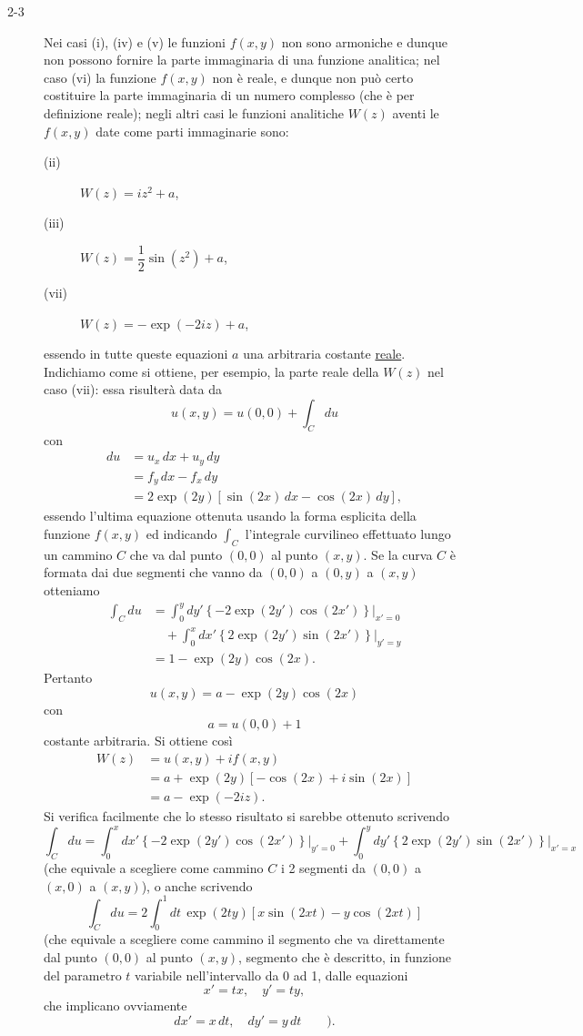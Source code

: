 \documentclass[11pt, a4paper]{book}
\numberwithin{equation}{section}
\begin{document}
\begin{description}
\item[2-3] Nei casi (i), (iv) e (v) le funzioni $f(x,y)$ non sono armoniche e dunque non possono fornire la parte immaginaria di una funzione analitica; nel caso (vi) la funzione $f(x,y)$ non è reale, e dunque non può certo costituire la parte immaginaria di un numero complesso (che è per definizione reale); negli altri casi le funzioni analitiche $W(z)$ aventi le $f(x,y)$ date come parti immaginarie sono:

\begin{description}
\item[(ii)] $W(z) = i z^2 + a$,
\item[(iii)] $W(z) = \dfrac{1}{2}\sin(z^2) + a$,
\item[(vii)] $W(z) = -\exp(-2iz) + a$,
\end{description}

essendo in tutte queste equazioni $a$ una arbitraria costante \underline{reale}. Indichiamo come si ottiene, per esempio, la parte reale della $W(z)$ nel caso (vii): essa risulterà data da
$$u(x,y) = u(0,0) + \int_C du$$
con
\begin{align*}
du &= u_x\, dx + u_y\, dy \\
&= f_y\, dx - f_x\, dy \\
&= 2\exp(2y)\left[\sin(2x)\, dx - \cos(2x)\, dy\right],
\end{align*}
essendo l'ultima equazione ottenuta usando la forma esplicita della funzione $f(x,y)$ ed indicando $\int_C$ l'integrale curvilineo effettuato lungo un cammino $C$ che va dal punto $(0,0)$ al punto $(x,y)$. Se la curva $C$ è formata dai due segmenti che vanno da $(0,0)$ a $(0,y)$ a $(x,y)$ otteniamo
\begin{align*}
\int_C du &= \int_0^y dy' \left\{-2\exp(2y')\cos(2x')\right\}\Big|_{x'=0} \\
&\quad + \int_0^x dx' \left\{2\exp(2y')\sin(2x')\right\}\Big|_{y'=y} \\
&= 1 - \exp(2y)\cos(2x).
\end{align*}
Pertanto
$$u(x,y) = a - \exp(2y)\cos(2x)$$
con
$$a = u(0,0) + 1$$
costante arbitraria. Si ottiene così
\begin{align*}
W(z) &= u(x,y) + i f(x,y) \\
&= a + \exp(2y)\left[-\cos(2x) + i\sin(2x)\right] \\
&= a - \exp(-2iz).
\end{align*}
Si verifica facilmente che lo stesso risultato si sarebbe ottenuto scrivendo
$$\int_C du = \int_0^x dx' \left\{-2\exp(2y')\cos(2x')\right\}\Big|_{y'=0} + \int_0^y dy' \left\{2\exp(2y')\sin(2x')\right\}\Big|_{x'=x}$$
(che equivale a scegliere come cammino $C$ i 2 segmenti da $(0,0)$ a $(x,0)$ a $(x,y)$), o anche scrivendo
$$\int_C du = 2\int_0^1 dt\, \exp(2ty)\left[x\sin(2xt) - y\cos(2xt)\right]$$
(che equivale a scegliere come cammino il segmento che va direttamente dal punto $(0,0)$ al punto $(x,y)$, segmento che è descritto, in funzione del parametro $t$ variabile nell'intervallo da 0 ad 1, dalle equazioni
$$x' = tx, \quad y' = ty,$$
che implicano ovviamente
$$dx' = x\, dt, \quad dy' = y\, dt \qquad).$$


\end{description}
\end{document}
